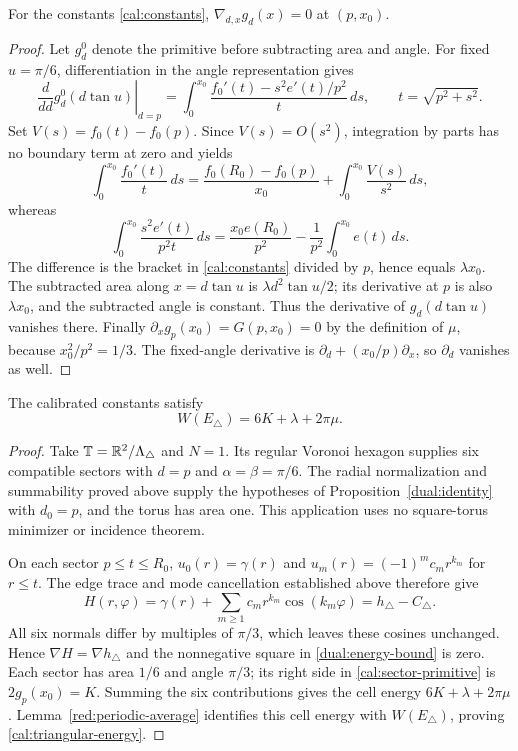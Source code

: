 \begin{lemma}\label{cal:stationarity}
For the constants \eqref{cal:constants},
$\nabla_{d,x}g_d(x)=0$ at $(p,x_0)$.
\end{lemma}
\begin{proof}
Let $g_d^0$ denote the primitive before subtracting area and angle.
For fixed $u=\pi/6$, differentiation in the angle representation gives
\[
 \left.\frac d{dd}g_d^0(d\tan u)\right|_{d=p}
 =\int_0^{x_0}\frac{f_0'(t)-s^2e'(t)/p^2}{t}\,ds,
 \qquad t=\sqrt{p^2+s^2}.
\]
Set $V(s)=f_0(t)-f_0(p)$.  Since $V(s)=O(s^2)$, integration by parts
has no boundary term at zero and yields
\[
 \int_0^{x_0}\frac{f_0'(t)}t\,ds
       =\frac{f_0(R_0)-f_0(p)}{x_0}
                         +\int_0^{x_0}\frac{V(s)}{s^2}\,ds,
\]
whereas
\[
 \int_0^{x_0}\frac{s^2e'(t)}{p^2t}\,ds
       =\frac{x_0e(R_0)}{p^2}-\frac1{p^2}\int_0^{x_0}e(t)\,ds.
\]
The difference is the bracket in \eqref{cal:constants} divided by $p$,
hence equals $\lambda x_0$.
The subtracted area along $x=d\tan u$ is $\lambda d^2\tan u/2$;
its derivative at $p$ is also $\lambda x_0$, and the subtracted angle is
constant.  Thus the derivative of $g_d(d\tan u)$ vanishes there.
Finally $\partial_xg_p(x_0)=G(p,x_0)=0$ by the definition of $\mu$,
because $x_0^2/p^2=1/3$.  The fixed-angle derivative is
$\partial_d+(x_0/p)\partial_x$, so $\partial_d$ vanishes as well.
\end{proof}

\begin{lemma}\label{cal:energy-identity}
The calibrated constants satisfy
\begin{equation}\label{cal:triangular-energy}
 W(E_\triangle)=6K+\lambda+2\pi\mu.
\end{equation}
\end{lemma}
\begin{proof}
Take $\mathbb T=\mathbb R^2/\Lambda_\triangle$ and $N=1$.  Its regular
Voronoi hexagon supplies six compatible sectors with $d=p$ and
$\alpha=\beta=\pi/6$.  The radial normalization and summability
proved above supply the hypotheses of Proposition~\ref{dual:identity}
with $d_0=p$, and the torus has area one.  This application uses no
square-torus minimizer or incidence theorem.

On each sector $p\le t\le R_0$,
$u_0(r)=\gamma(r)$ and $u_m(r)=(-1)^mc_mr^{k_m}$ for $r\le t$.
The edge trace and mode cancellation established above therefore give
\[
 H(r,\varphi)=\gamma(r)+\sum_{m\ge1}c_mr^{k_m}\cos(k_m\varphi)
             =h_\triangle-C_\triangle.
\]
All six normals differ by multiples of $\pi/3$, which leaves these
cosines unchanged.  Hence $\nabla H=\nabla h_\triangle$ and the
nonnegative square in \eqref{dual:energy-bound} is zero.
Each sector has area $1/6$ and angle $\pi/3$; its right side in
\eqref{cal:sector-primitive} is $2g_p(x_0)=K$.
Summing the six contributions gives the cell energy
$6K+\lambda+2\pi\mu$.  Lemma~\ref{red:periodic-average} identifies
this cell energy with $W(E_\triangle)$, proving
\eqref{cal:triangular-energy}.
\end{proof}

